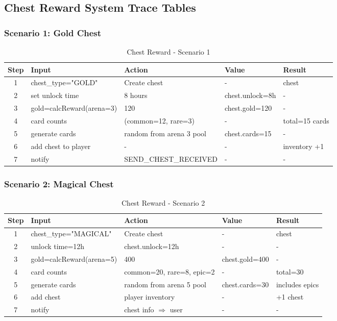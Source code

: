 \documentclass{article}
\begin{document}
\FloatBarrier

\subsection{Chest Reward System Trace Tables}

\subsubsection{Scenario 1: Gold Chest}
\begin{table}[H]
\centering
\footnotesize
  \begin{tabularx}{\textwidth}{|c|p{5.0cm}|p{4cm}|p{2.5cm}|X|}
\hline
\textbf{Step} & \textbf{Input} & \textbf{Action} & \textbf{Value} & \textbf{Result}\\
\hline
1 & chest\_type="GOLD" & Create chest & - & chest \\
\hline
2 & set unlock time & 8 hours & chest.unlock=8h & - \\
\hline
3 & gold=calcReward(arena=3) & 120 & chest.gold=120 & - \\
\hline
4 & card counts & (common=12, rare=3) & - & total=15 cards \\
\hline
5 & generate cards & random from arena 3 pool & chest.cards=15 & - \\
\hline
6 & add chest to player & - & - & inventory +1 \\
\hline
7 & notify & SEND\_CHEST\_RECEIVED & - & - \\
\hline
\end{tabularx}
\caption{Chest Reward - Scenario 1}
\end{table}

\subsubsection{Scenario 2: Magical Chest}
\begin{table}[H]
\centering
\footnotesize
\begin{tabularx}{\textwidth}{|c|p{5.0cm}|X|p{2.5cm}|X|}
\hline
\textbf{Step} & \textbf{Input} & \textbf{Action} & \textbf{Value} & \textbf{Result}\\
\hline
1 & chest\_type="MAGICAL" & Create chest & - & chest \\
\hline
2 & unlock time=12h & chest.unlock=12h & - & - \\
\hline
3 & gold=calcReward(arena=5) & 400 & chest.gold=400 & - \\
\hline
4 & card counts & common=20, rare=8, epic=2 & - & total=30 \\
\hline
5 & generate cards & random from arena 5 pool & chest.cards=30 & includes epics \\
\hline
6 & add chest & player inventory & - & +1 chest \\
\hline
7 & notify & chest info $\Rightarrow$ user & - & - \\
\hline
\end{tabularx}
\caption{Chest Reward - Scenario 2}
\end{table}

\FloatBarrier
\end{document}
